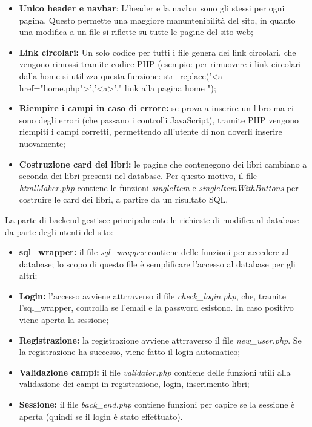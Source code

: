 \begin{itemize}
    \item \textbf{Unico header e navbar}: L'header e la navbar sono gli stessi per ogni pagina. Questo permette una maggiore manuntenibilità del sito, in quanto una modifica a un file si riflette su tutte le pagine del sito web;
    \item \textbf{Link circolari:} Un solo codice per tutti i file genera dei link circolari, che vengono rimossi tramite codice PHP (esempio: per rimuovere i link circolari dalla home si utilizza questa funzione: str\_replace('<a href="home.php">','<a>',"\- link alla pagina home \-");
    \item \textbf{Riempire i campi in caso di errore:} se prova a inserire un libro ma ci sono degli errori (che passano i controlli JavaScript), tramite PHP vengono riempiti i campi corretti, permettendo all'utente di non doverli inserire nuovamente;
    \item \textbf{Costruzione card dei libri:} le pagine che contenegono dei libri cambiano a seconda dei libri presenti nel database. Per questo motivo, il file \textit{htmlMaker.php} contiene le funzioni \textit{singleItem} e \textit{singleItemWithButtons} per costruire le card dei libri, a partire da un risultato SQL.
\end{itemize}
La parte di backend gestisce principalmente le richieste di modifica al database da parte degli utenti del sito:
\begin{itemize}
    \item \textbf{sql\_wrapper:} il file \textit{sql\_wrapper} contiene delle funzioni per accedere al database; lo scopo di questo file è semplificare l'accesso al database per gli altri;  
    \item \textbf{Login:} l'accesso avviene attrraverso il file \textit{check\_login.php}, che, tramite l'sql\_wrapper, controlla se l'email e la password esistono. In caso positivo viene aperta la sessione;
    \item \textbf{Registrazione:} la registrazione avviene attrraverso il file \textit{new\_user.php}. Se la registrazione ha successo, viene fatto il login automatico;
    \item \textbf{Validazione campi:} il file \textit{validator.php} contiene delle funzioni utili alla validazione dei campi in registrazione, login, inserimento libri;
    \item \textbf{Sessione:} il file \textit{back\_end.php} contiene funzioni per capire se la sessione è aperta (quindi se il login è stato effettuato).
\end{itemize}